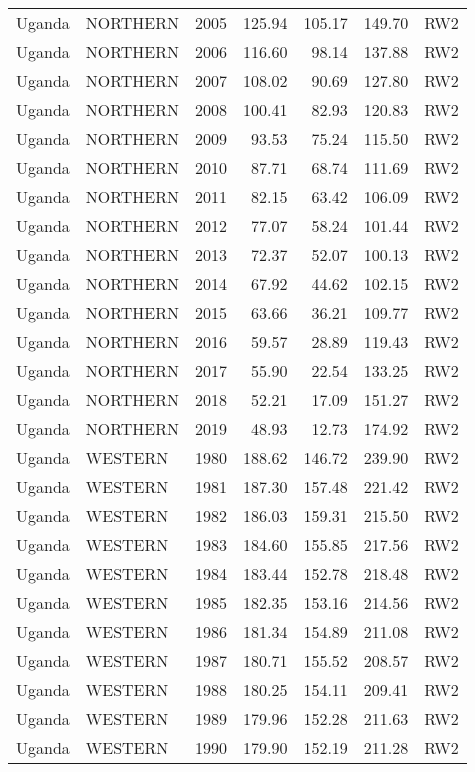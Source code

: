 \begin{longtable}{lllrrrl}
  Uganda & NORTHERN & 2005 & 125.94 & 105.17 & 149.70 & RW2 \\ 
  Uganda & NORTHERN & 2006 & 116.60 & 98.14 & 137.88 & RW2 \\ 
  Uganda & NORTHERN & 2007 & 108.02 & 90.69 & 127.80 & RW2 \\ 
  Uganda & NORTHERN & 2008 & 100.41 & 82.93 & 120.83 & RW2 \\ 
  Uganda & NORTHERN & 2009 & 93.53 & 75.24 & 115.50 & RW2 \\ 
  Uganda & NORTHERN & 2010 & 87.71 & 68.74 & 111.69 & RW2 \\ 
  Uganda & NORTHERN & 2011 & 82.15 & 63.42 & 106.09 & RW2 \\ 
  Uganda & NORTHERN & 2012 & 77.07 & 58.24 & 101.44 & RW2 \\ 
  Uganda & NORTHERN & 2013 & 72.37 & 52.07 & 100.13 & RW2 \\ 
  Uganda & NORTHERN & 2014 & 67.92 & 44.62 & 102.15 & RW2 \\ 
  Uganda & NORTHERN & 2015 & 63.66 & 36.21 & 109.77 & RW2 \\ 
  Uganda & NORTHERN & 2016 & 59.57 & 28.89 & 119.43 & RW2 \\ 
  Uganda & NORTHERN & 2017 & 55.90 & 22.54 & 133.25 & RW2 \\ 
  Uganda & NORTHERN & 2018 & 52.21 & 17.09 & 151.27 & RW2 \\ 
  Uganda & NORTHERN & 2019 & 48.93 & 12.73 & 174.92 & RW2 \\ 
  Uganda & WESTERN & 1980 & 188.62 & 146.72 & 239.90 & RW2 \\ 
  Uganda & WESTERN & 1981 & 187.30 & 157.48 & 221.42 & RW2 \\ 
  Uganda & WESTERN & 1982 & 186.03 & 159.31 & 215.50 & RW2 \\ 
  Uganda & WESTERN & 1983 & 184.60 & 155.85 & 217.56 & RW2 \\ 
  Uganda & WESTERN & 1984 & 183.44 & 152.78 & 218.48 & RW2 \\ 
  Uganda & WESTERN & 1985 & 182.35 & 153.16 & 214.56 & RW2 \\ 
  Uganda & WESTERN & 1986 & 181.34 & 154.89 & 211.08 & RW2 \\ 
  Uganda & WESTERN & 1987 & 180.71 & 155.52 & 208.57 & RW2 \\ 
  Uganda & WESTERN & 1988 & 180.25 & 154.11 & 209.41 & RW2 \\ 
  Uganda & WESTERN & 1989 & 179.96 & 152.28 & 211.63 & RW2 \\ 
  Uganda & WESTERN & 1990 & 179.90 & 152.19 & 211.28 & RW2 \\ 

\end{longtable}
